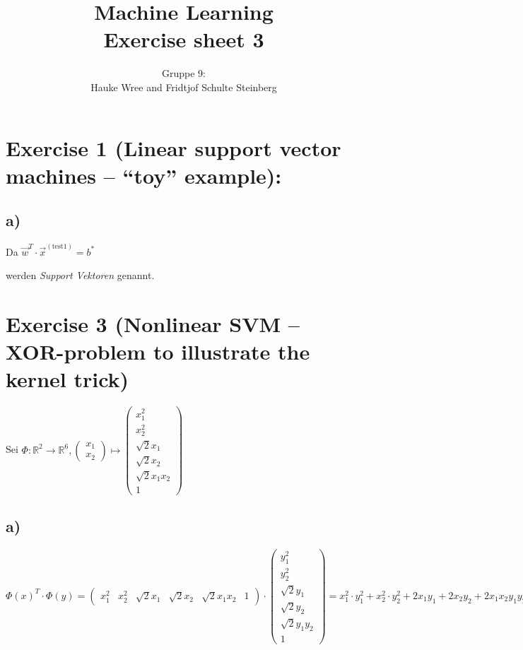 \documentclass[a4paper,parskip=full-]{article}
\title{Machine Learning \\
Exercise sheet 3}
\author{Gruppe 9: \\Hauke Wree and Fridtjof Schulte Steinberg}
\newcommand{\R}[0]{{\mathbb{R}}}
\begin{document}
\maketitle

\section{Exercise 1 (Linear support vector machines – “toy” example):}

\subsection{a)}

Da $\vec{w}^T \cdot \vec{x}^{(\text{test1})} = b^*$


werden \textit{Support Vektoren} genannt. 
\section{Exercise 3 (Nonlinear SVM – XOR-problem to illustrate the kernel trick)}
Sei 
$\Phi : \R^2 \rightarrow \R^6, \begin{pmatrix} x_1 \\ x_2 \end{pmatrix} \mapsto 
\begin{pmatrix} x_1^2 \\ x_2^2 \\ \sqrt{2} x_1 \\ \sqrt{2} x_2 \\ \sqrt{2} x_1 x_2 \\ 1 \end{pmatrix}$

\subsection{a)}
$$
\Phi(x)^T \cdot \Phi(y) = 
\begin{pmatrix} 
x_1^2 & x_2^2 & \sqrt{2} x_1 & \sqrt{2} x_2 & \sqrt{2} x_1 x_2 & 1 
\end{pmatrix} 
\cdot \begin{pmatrix} y_1^2 \\ y_2^2 \\ \sqrt{2} y_1 \\ \sqrt{2} y_2 \\ \sqrt{2} y_1 y_2 \\ 1 \end{pmatrix}
= x_1^2 \cdot y_1^2 + x_2^2 \cdot y_2^2 + 2 x_1 y_1 + 2 x_2 y_2 + 2 x_1 x_2 y_1 y_2 + 1
$$
\end{document}
